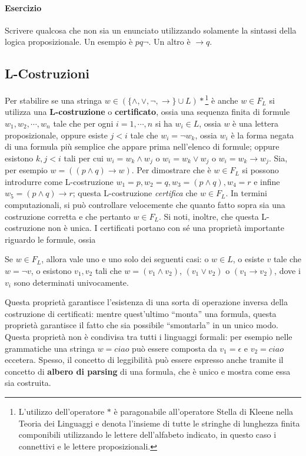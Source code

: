 \paragraph{Esercizio}
Scrivere qualcosa che non sia un enunciato utilizzando solamente la sintassi della 
logica proposizionale. Un esempio è $p q \neg$. Un altro è $\rightarrow q$.

\subsection{L-Costruzioni}
Per stabilire se una stringa $w \in (\{\land, \lor, \neg, \rightarrow\}
\cup L)*$\footnote{L'utilizzo dell'operatore $*$ è paragonabile all'operatore 
  Stella di Kleene nella Teoria dei Linguaggi e denota l'insieme di tutte le
  stringhe di lunghezza finita componibili utilizzando le lettere 
  dell'alfabeto indicato, in questo caso i connettivi e le lettere 
proposizionali.}
è anche $w \in F_L$ si utilizza una \textbf{L-costruzione} o 
\textbf{certificato}, ossia una sequenza finita di formule $w_1, w_2, \cdots, w_n$ tale che 
per ogni $i = 1,\cdots, n$ si ha $w_i \in L$, ossia 
$w$ è una lettera proposizionale, oppure esiste $j < i$ tale 
che $w_i = \neg w_k$, ossia $w_i$ è la forma negata 
di una formula più semplice che appare prima nell'elenco di 
formule; oppure esistono $k,j < i$ tali per cui 
$w_i = w_k \land w_j$ o $w_i = w_k \lor w_j$ o $w_i = w_k \rightarrow w_j$.
Sia, per esempio $w = ((p\land q)\rightarrow w)$. Per dimostrare che 
è $w \in F_L$ si possono introdurre come L-costruzione 
$w_1 = p, w_2 = q, w_3 = (p\land q), w_4 = r$ e infine $w_5 = (p \land q) \rightarrow r$; 
questa L-costruzione \textit{certifica} che $w \in F_L$.
In termini computazionali, si può controllare velocemente che quanto fatto 
sopra sia una costruzione corretta e che pertanto $w \in F_L$. Si noti, inoltre, 
che questa L-costruzione non è unica. 
I certificati portano con sé una proprietà importante riguardo le formule, 
ossia 
\begin{pro}
Se $w \in F_L$, allora vale uno e uno solo dei seguenti casi: o $w \in L$, 
o esiste $v$ tale che $w = \neg v$, o esistono $v_1, v_2$ tali che 
$w = (v_1 \land v_2)$, 
$(v_1 \lor v_2)$ o $(v_1 \rightarrow v_2)$, dove i $v_i$ sono determinati 
univocamente. 
\end{pro}
Questa proprietà garantisce l'esistenza di una sorta di operazione 
inversa della costruzione di certificati: mentre quest'ultimo ``monta'' 
una formula, questa proprietà garantisce il fatto che sia possibile 
``smontarla'' in un unico modo.
Questa proprietà non è condivisa tra tutti i linguaggi formali: per 
esempio nelle grammatiche una stringa $w = ciao$ può essere composta da $v_1 = \epsilon$ 
e $v_2 = ciao$ eccetera. 
Spesso, il concetto di leggibilità può essere espresso anche tramite il concetto 
di \textbf{albero di parsing} di una formula, che è unico e mostra come 
essa sia costruita. 

